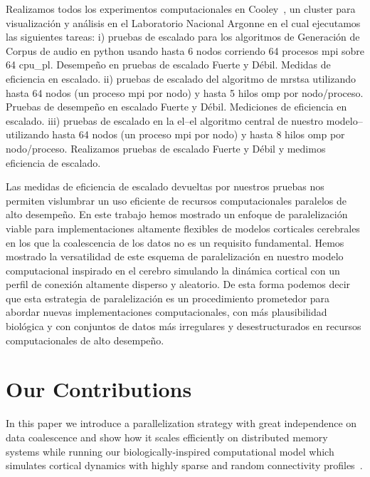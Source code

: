{Realizamos todos los experimentos computacionales en Cooley~\cite{noauthor_cooley_nodate}, un cluster para visualización y análisis en el Laboratorio Nacional Argonne en el cual ejecutamos las siguientes tareas: 
i) pruebas de escalado para los algoritmos de Generación de Corpus de audio en python usando hasta 6 nodos corriendo 64 procesos \gls{mpi} sobre 64 \gls{cpu_pl}.
Desempeño en pruebas de escalado Fuerte y Débil. Medidas de eficiencia en escalado.
ii) pruebas de escalado del algoritmo de \gls{mrstsa} utilizando hasta 64 nodos (un proceso \gls{mpi} por nodo) y hasta 5 hilos \gls{omp} por nodo/proceso.
Pruebas de desempeño en escalado Fuerte y Débil. Mediciones de eficiencia en escalado. 
iii) pruebas de escalado en la \gls{el}--el algoritmo central de nuestro modelo--utilizando hasta 64 nodos (un proceso \gls{mpi} por nodo) y hasta 8 hilos \gls{omp} por nodo/proceso. Realizamos pruebas de escalado Fuerte y Débil y medimos eficiencia de escalado.

Las medidas de eficiencia de escalado devueltas por nuestros pruebas nos permiten vislumbrar un uso eficiente de recursos computacionales paralelos de alto desempeño.
En este trabajo hemos mostrado un enfoque de paralelización viable para implementaciones altamente flexibles de modelos corticales cerebrales en los que la coalescencia de los datos no es un requisito fundamental.
Hemos mostrado la versatilidad de este esquema de paralelización en nuestro modelo computacional inspirado en el cerebro simulando la dinámica cortical con un perfil de conexión altamente disperso y aleatorio.
De esta forma podemos decir que esta estrategia de paralelización es un procedimiento prometedor para abordar nuevas implementaciones computacionales, con más plausibilidad biológica y con conjuntos de datos más irregulares y desestructurados en recursos computacionales de alto desempeño.
}{
\section{Our Contributions}

In this paper we introduce a parallelization strategy with great independence on data coalescence and show how it scales efficiently on distributed memory systems while running our biologically-inspired computational model which simulates cortical dynamics with highly sparse and random connectivity profiles~\cite{10.1371/journal.pone.0217966}.

}
